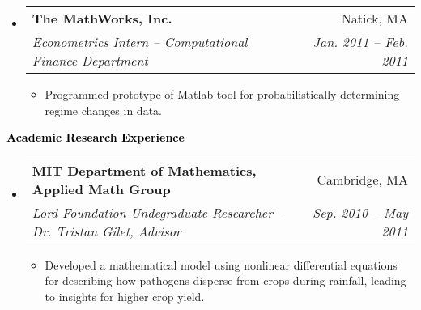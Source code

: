\documentclass[letterpaper,11pt]{article}
\makeatletter
\newcommand{\resitem}[1]{\item #1 \vspace{-2pt}}
\newcommand{\resheading}[1]{{\large \colorbox{mygrey}{\begin{minipage}{\textwidth}{\textbf{ \textcolor{Black}{#1 \vphantom{p\^{E}}}}}\end{minipage}}}}
\newcommand{\ressubheading}[4]{
\begin{tabular*}{6.5in}{l@{\extracolsep{\fill}}r}
		\textbf{#1} & #2 \\
		\textit{#3} & \textit{#4} \\
\end{tabular*}\vspace{-6pt}}
\makeatother
\begin{document}
\begin{itemize}
		\item 
			\ressubheading{The MathWorks, Inc.}{Natick, MA}{ Econometrics Intern -- Computational Finance Department}{Jan. 2011 -- Feb. 2011}
				{ \footnotesize
				\begin{itemize}
					\resitem{Programmed prototype of Matlab tool for probabilistically determining regime changes in data.}
				\end{itemize}
			}
				
	\end{itemize} %

\resheading{Academic Research Experience}	
	\begin{itemize}
		\item
			\ressubheading{MIT Department of Mathematics, Applied Math Group}{Cambridge, MA}{{Lord Foundation Undegraduate Researcher -- Dr. Tristan Gilet, Advisor}}{Sep. 2010 -- May 2011}
				{ \footnotesize
				\begin{itemize}
					\resitem{Developed a mathematical model using nonlinear differential equations for describing how pathogens disperse from crops during rainfall, leading to insights for higher crop yield.} 
				\end{itemize}
				}


\end{itemize}
\end{document}
